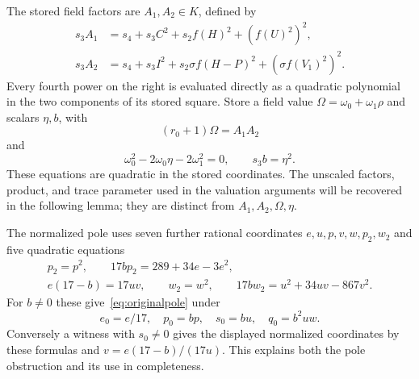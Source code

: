 \documentclass[11pt,a4paper]{article}
\begin{document}
The stored field factors are $A_1,A_2\in K$, defined by
\begin{equation}\label{eq:clearedfactors}
\begin{split}
 s_3A_1&=s_4+s_3C^2+s_2f(H)^2+(f(U)^2)^2,\\
 s_3A_2&=s_4+s_3I^2+s_2\sigma f(H-P)^2+(\sigma f(V_1)^2)^2.
\end{split}
\end{equation}
Every fourth power on the right is evaluated directly as a quadratic
polynomial in the two components of its stored square. Store a field
value $\Omega=\omega_0+\omega_1\rho$ and scalars $\eta,b$, with
\begin{equation}\label{eq:normalizedproduct}
                         (r_0+1)\Omega=A_1A_2
\end{equation}
and
\begin{equation}\label{eq:scaledtrace}
 \omega_0^2-2\omega_0\eta-2\omega_1^2=0,
 \qquad s_3b=\eta^2.
\end{equation}
These equations are quadratic in the stored coordinates. The
unscaled factors, product, and trace parameter used in the valuation
arguments will be recovered in the following lemma; they are distinct
from $A_1,A_2,\Omega,\eta$.

The normalized pole uses seven further rational coordinates
$e,u,p,v,w,p_2,w_2$ and five quadratic equations
\begin{equation}\label{eq:normalizedpole}
 \begin{gathered}
 p_2=p^2,\qquad 17bp_2=289+34e-3e^2,\\
 e(17-b)=17uv,\qquad w_2=w^2,\qquad
 17bw_2=u^2+34uv-867v^2.
 \end{gathered}
\end{equation}
For $b\ne0$ these give~\eqref{eq:originalpole} under
\[
 e_0=e/17,\quad p_0=bp,\quad s_0=bu,\quad q_0=b^2uw.
\]
Conversely a witness with $s_0\ne0$ gives the displayed normalized
coordinates by these formulas and $v=e(17-b)/(17u)$.
This explains both the pole obstruction and its use in completeness.
\end{document}

